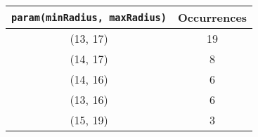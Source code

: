 \documentclass[letterpaper, 12pt]{article}
\begin{document}
\begin{longtable}{|c|c|}
\hline
\textbf{\texttt{param(minRadius, maxRadius)}} & \textbf{Occurrences} \\
\hline
(13, 17) & 19 \\
\hline
(14, 17) & 8 \\
\hline
(14, 16) & 6 \\
\hline
(13, 16) & 6 \\
\hline
(15, 19) & 3 \\
\hline
\end{longtable}
\end{document}
